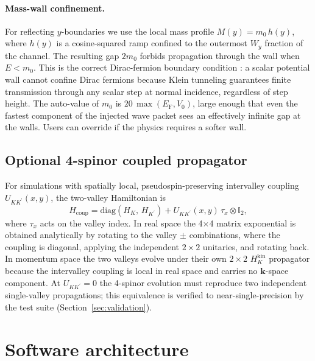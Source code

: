 \documentclass[preprint, 11pt]{elsarticle}
\newcommand{\EF}{E_\mathrm{F}}
\begin{document}
\paragraph{Mass-wall confinement.}
For reflecting $y$-boundaries we use the local mass profile
$M(y)=m_0\,h(y)$, where $h(y)$ is a cosine-squared ramp confined to
the outermost $W_y$ fraction of the channel. The resulting gap $2m_0$
forbids propagation through the wall when $E<m_0$. This is the
correct Dirac-fermion boundary condition \cite{Berry1987}: a scalar
potential wall cannot confine Dirac fermions because Klein tunneling
guarantees finite transmission through any scalar step at normal
incidence, regardless of step height. The auto-value of $m_0$ is
$20\,\max(\EF,V_0)$, large enough that even the fastest component of
the injected wave packet sees an effectively infinite gap at the
walls. Users can override if the physics requires a softer wall.

\subsection{Optional 4-spinor coupled propagator}

For simulations with spatially local, pseudospin-preserving
intervalley coupling $U_{KK^\prime}(x,y)$, the two-valley
Hamiltonian is
%
\begin{equation}
H_\mathrm{coup} = \mathrm{diag}(H_K,\,H_{K^\prime})
                + U_{KK^\prime}(x,y)\,\tau_x\otimes\mathbb{I}_2,
\end{equation}
%
where $\tau_x$ acts on the valley index. In real space the 4$\times$4
matrix exponential is obtained analytically by rotating to the valley
$\pm$ combinations, where the coupling is diagonal, applying the
independent $2\times2$ unitaries, and rotating back. In momentum space
the two valleys evolve under their own $2\times2$ $H_K^\mathrm{kin}$
propagator because the intervalley coupling is local in real space
and carries no $\mathbf{k}$-space component. At $U_{KK^\prime}=0$
the 4-spinor evolution must reproduce two independent single-valley
propagations; this equivalence is verified to near-single-precision
by the test suite (Section~\ref{sec:validation}).

\section{Software architecture}
\label{sec:software}
\end{document}
